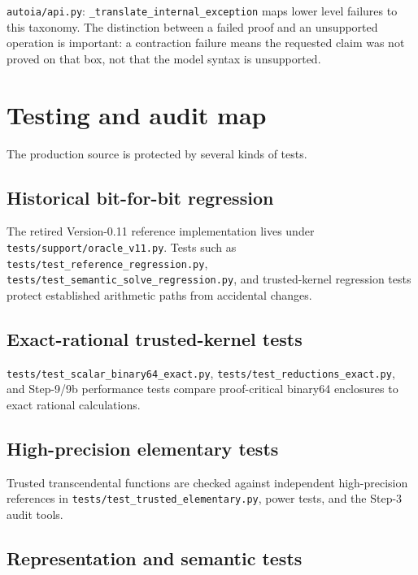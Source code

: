 \documentclass[11pt]{article}
\newcommand{\codepath}[1]{\nolinkurl{#1}}
\begin{document}
\codepath{autoia/api.py}: \texttt{\_translate\_internal\_exception} maps lower
level failures to this taxonomy.  The distinction between a failed proof and an
unsupported operation is important: a contraction failure means the requested
claim was not proved on that box, not that the model syntax is unsupported.

\section{Testing and audit map}

The production source is protected by several kinds of tests.

\subsection{Historical bit-for-bit regression}

The retired Version-0.11 reference implementation lives under
\codepath{tests/support/oracle_v11.py}.  Tests such as
\codepath{tests/test_reference_regression.py},
\codepath{tests/test_semantic_solve_regression.py}, and trusted-kernel regression
tests protect established arithmetic paths from accidental changes.

\subsection{Exact-rational trusted-kernel tests}

\codepath{tests/test_scalar_binary64_exact.py},
\codepath{tests/test_reductions_exact.py}, and Step-9/9b performance tests compare
proof-critical binary64 enclosures to exact rational calculations.

\subsection{High-precision elementary tests}

Trusted transcendental functions are checked against independent high-precision
references in \codepath{tests/test_trusted_elementary.py}, power tests, and the
Step-3 audit tools.

\subsection{Representation and semantic tests}
\end{document}

